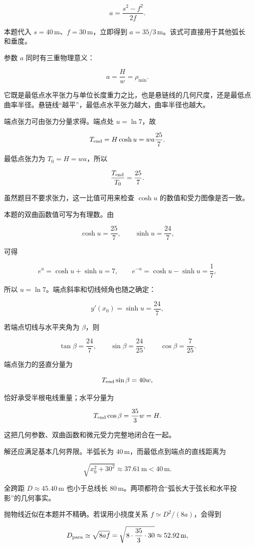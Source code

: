 \documentclass[12pt,a4paper,UTF8]{ctexart}
\begin{document}
\[
\boxed{a=\frac{s^2-f^2}{2f}}.
\]

本题代入 \(s=40\,\mathrm m\)、\(f=30\,\mathrm m\)，立即得到
\(a=35/3\,\mathrm m\)。该式可直接用于其他弧长和垂度。

参数 \(a\) 同时有三重物理意义：

\[
a=\frac Hw=\rho_{\min}.
\]

它既是最低点水平张力与单位长度重力之比，也是悬链线的几何尺度，还是最低点曲率半径。悬链线``越平''，最低点水平张力越大，曲率半径也越大。

端点张力可由张力分量求得。端点处 \(u=\ln7\)，故

\[
T_{\rm end}
=H\cosh u
=wa\frac{25}{7}.
\]

最低点张力为 \(T_0=H=wa\)，所以

\[
\frac{T_{\rm end}}{T_0}=\frac{25}{7}.
\]

虽然题目不要求张力，这一比值可用来检查 \(\cosh u\)
的数值和受力图像是否一致。

本题的双曲函数值可写为有理数。由

\[
\cosh u=\frac{25}{7},\qquad
\sinh u=\frac{24}{7},
\]

可得

\[
e^u=\cosh u+\sinh u=7,\qquad
e^{-u}=\cosh u-\sinh u=\frac17,
\]

所以 \(u=\ln7\)。端点斜率和切线倾角也随之确定：

\[
y'(x_0)=\sinh u=\frac{24}{7},
\]

若端点切线与水平夹角为 \(\beta\)，则

\[
\tan\beta=\frac{24}{7},\qquad
\sin\beta=\frac{24}{25},\qquad
\cos\beta=\frac7{25}.
\]

端点张力的竖直分量为

\[
T_{\rm end}\sin\beta=40w,
\]

恰好承受半根电线重量；水平分量为

\[
T_{\rm end}\cos\beta=\frac{35}{3}w=H.
\]

这把几何参数、双曲函数和微元受力完整地闭合在一起。

解还应满足基本几何界限。半弧长为
\(40\,\mathrm m\)，而最低点到端点的直线距离为

\[
\sqrt{x_0^2+30^2}
\approx37.61\,\mathrm m<40\,\mathrm m.
\]

全跨距 \(D\approx45.40\,\mathrm m\) 也小于总线长
\(80\,\mathrm m\)。两项都符合``弧长大于弦长和水平投影''的几何事实。

抛物线近似在本题并不精确。若误用小挠度关系 \(f\simeq D^2/(8a)\)，会得到

\[
D_{\rm para}\simeq\sqrt{8af}
=\sqrt{8\cdot\frac{35}{3}\cdot30}
\approx52.92\,\mathrm m,
\]
\end{document}
